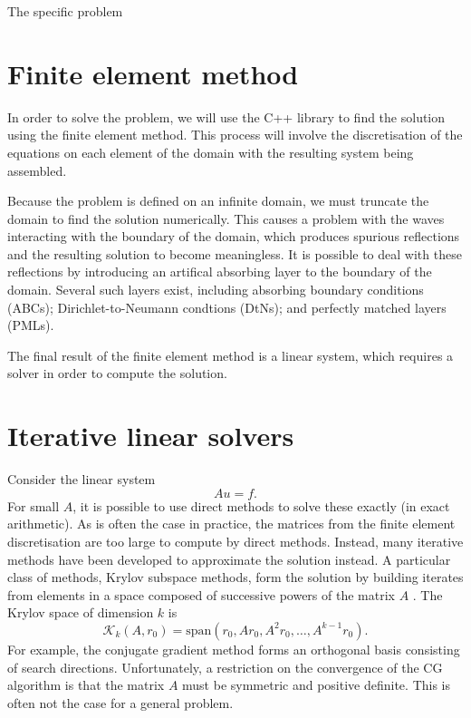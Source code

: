 The specific problem 





\section{Finite element method}

In order to solve the problem, we will use the C++ library \oomph to find the solution using the finite element method.
This process will involve the discretisation of the equations on each element of the domain with the resulting system being assembled.

Because the problem is defined on an infinite domain, we must truncate the domain to find the solution numerically.
This causes a problem with the waves interacting with the boundary of the domain, which produces spurious reflections and the resulting solution to become meaningless.
It is possible to deal with these reflections by introducing an artifical absorbing layer to the boundary of the domain.
Several such layers exist, including absorbing boundary conditions (ABCs); Dirichlet-to-Neumann condtions (DtNs); and perfectly matched layers (PMLs).

The final result of the finite element method is a linear system, which requires a solver in order to compute the solution.





\section{Iterative linear solvers}

Consider the linear system
\[
	A u = f.
\]
For small $A$, it is possible to use direct methods to solve these exactly (in exact arithmetic).
As is often the case in practice, the matrices from the finite element discretisation are too large to compute by direct methods.
Instead, many iterative methods have been developed to approximate the solution instead.
A particular class of methods, Krylov subspace methods, form the solution by building iterates from elements in a space composed of successive powers of the matrix $A$ \cite{leveque}.
The Krylov space of dimension $k$ is 
\[
	\mathcal{K}_k(A, r_0) = \mathrm{span}(r_0, Ar_0, A^2 r_0, \ldots, A^{k-1} r_0).
\]
For example, the conjugate gradient method forms an orthogonal basis consisting of search directions.
Unfortunately, a restriction on the convergence of the CG algorithm is that the matrix $A$ must be symmetric and positive definite.
This is often not the case for a general problem.

